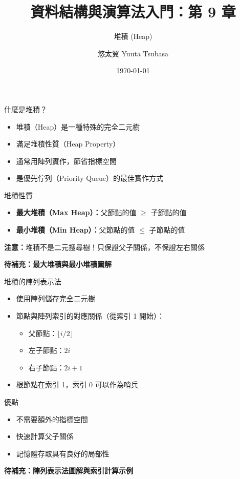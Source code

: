 \documentclass{beamer}
\begin{document}
\title{資料結構與演算法入門：第 9 章}
\subtitle{堆積 (Heap)}
\author{悠太翼 Yuuta Tsubasa}
\date{\today}

\frame{\titlepage}

\begin{frame}{什麼是堆積？}
\begin{itemize}
    \item 堆積（Heap）是一種特殊的完全二元樹
    \item 滿足堆積性質（Heap Property）
    \item 通常用陣列實作，節省指標空間
    \item 是優先佇列（Priority Queue）的最佳實作方式
\end{itemize}

\vspace{1em}
\begin{block}{堆積性質}
\begin{itemize}
    \item \textbf{最大堆積（Max Heap）：}父節點的值 $\geq$ 子節點的值
    \item \textbf{最小堆積（Min Heap）：}父節點的值 $\leq$ 子節點的值
\end{itemize}
\end{block}

\vspace{1em}
\textbf{注意：}堆積不是二元搜尋樹！只保證父子關係，不保證左右關係

\vspace{1em}
\begin{center}
\textbf{待補充：最大堆積與最小堆積圖解}
\end{center}
\end{frame}

\begin{frame}{堆積的陣列表示法}
\begin{itemize}
    \item 使用陣列儲存完全二元樹
    \item 節點與陣列索引的對應關係（從索引 1 開始）：
    \begin{itemize}
        \item 父節點：$\lfloor i/2 \rfloor$
        \item 左子節點：$2i$
        \item 右子節點：$2i + 1$
    \end{itemize}
    \item 根節點在索引 1，索引 0 可以作為哨兵
\end{itemize}

\vspace{1em}
\begin{block}{優點}
\begin{itemize}
    \item 不需要額外的指標空間
    \item 快速計算父子關係
    \item 記憶體存取具有良好的局部性
\end{itemize}
\end{block}

\vspace{1em}
\textbf{待補充：陣列表示法圖解與索引計算示例}
\end{frame}
\end{document}

